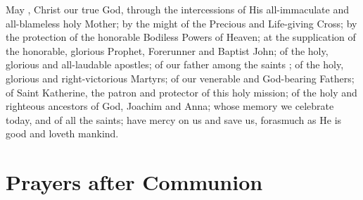 \documentclass[twoside, letterpaper, 12pt]{report}
\begin{document}
\begin{priest}
\item May , Christ our true God, through the intercessions of His
    all-immaculate and all-blameless holy Mother; by the might of the Precious and Life-giving Cross;
    by the protection of the honorable Bodiless Powers of Heaven;
    at the supplication of the honorable, glorious Prophet, Forerunner and Baptist John;
    of the holy, glorious and all-laudable apostles;
    of our father among the saints
      ;
    of the holy, glorious and right-victorious Martyrs;
    of our venerable and God-bearing Fathers;
    of Saint Katherine, the patron and protector of this holy mission;
    of the holy and righteous ancestors of God, Joachim and Anna;
     whose memory we celebrate today,
    and of all the saints;
    have mercy on us and save us, forasmuch as He is good and loveth mankind.
\item \throughtheprayers{}
\end{priest}


\cleardoublepage
\chapter*{Prayers after Communion}
\begin{maybetwocolumns}

\end{maybetwocolumns}
\end{document}
